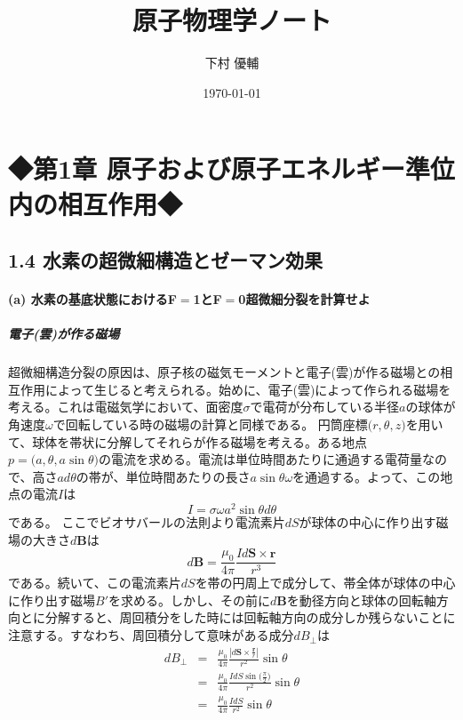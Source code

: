 \documentclass[11pt,a4paper]{jsarticle}
\begin{document}
\title{原子物理学ノート}
\author{下村 優輔}
\date{\today}
\maketitle
%
\section*{◆第1章 原子および原子エネルギー準位内の相互作用◆}
\subsection*{1.4 水素の超微細構造とゼーマン効果}
\paragraph{(a) 水素の基底状態におけるF$=$1とF$=$0超微細分裂を計算せよ\\}
\subparagraph{電子(雲)が作る磁場}
超微細構造分裂の原因は、原子核の磁気モーメントと電子(雲)が作る磁場との相互作用によって生じると考えられる。始めに、電子(雲)によって作られる磁場を考える。これは電磁気学において、面密度$\sigma$で電荷が分布している半径$a$の球体が角速度$\omega$で回転している時の磁場の計算と同様である。
円筒座標$\bigl(r,\theta,z\bigr)$を用いて、球体を帯状に分解してそれらが作る磁場を考える。ある地点$p=\bigl(a,\theta,a\sin\theta\bigr)$の電流を求める。電流は単位時間あたりに通過する電荷量なので、高さ$ad\theta$の帯が、単位時間あたりの長さ$a\sin\theta\omega$を通過する。よって、この地点の電流$I$は
\begin{equation}
  \label{current}
  I = \sigma\omega a^{2} \sin\theta d\theta
\end{equation}
である。
ここでビオサバールの法則より電流素片$dS$が球体の中心に作り出す磁場の大きさ$d\bm{B}$は
\begin{equation}
  d\bm{B} = \frac{\mu_0}{4\pi} \frac{I d\bm{S} \times \bm{r}}{r^{3}}
\end{equation}
である。続いて、この電流素片$dS$を帯の円周上で成分して、帯全体が球体の中心に作り出す磁場$B'$を求める。しかし、その前に$d\bm{B}$を動径方向と球体の回転軸方向とに分解すると、周回積分をした時には回転軸方向の成分しか残らないことに注意する。すなわち、周回積分して意味がある成分$dB_\bot$は
\begin{eqnarray}
  dB_\bot&=& \frac{\mu_0}{4\pi} \frac{|d\bm{S} \times \frac{\bm{r}}{r}|}{r^2} \sin\theta \\
  &=& \frac{\mu_0}{4\pi} \frac{IdS \sin\bigl(\frac{\pi}{2}\bigr)}{r^2}\sin\theta\\
  &=& \frac{\mu_0}{4\pi} \frac{IdS}{r^2} \sin\theta
\end{eqnarray}
\end{document}
